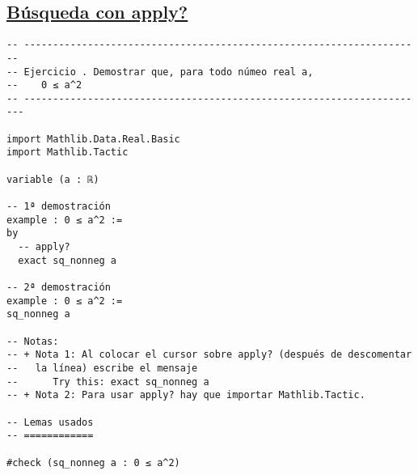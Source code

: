 \subsection{\href{./src/Basicos/Uso\_de\_library\_search.lean}{Búsqueda con apply?}}
\label{sec:org62f7ca8}
\begin{verbatim}
-- ---------------------------------------------------------------------
-- Ejercicio . Demostrar que, para todo númeo real a,
--    0 ≤ a^2
-- ----------------------------------------------------------------------

import Mathlib.Data.Real.Basic
import Mathlib.Tactic

variable (a : ℝ)

-- 1ª demostración
example : 0 ≤ a^2 :=
by
  -- apply?
  exact sq_nonneg a

-- 2ª demostración
example : 0 ≤ a^2 :=
sq_nonneg a

-- Notas:
-- + Nota 1: Al colocar el cursor sobre apply? (después de descomentar
--   la línea) escribe el mensaje
--      Try this: exact sq_nonneg a
-- + Nota 2: Para usar apply? hay que importar Mathlib.Tactic.

-- Lemas usados
-- ============

#check (sq_nonneg a : 0 ≤ a^2)
\end{verbatim}

